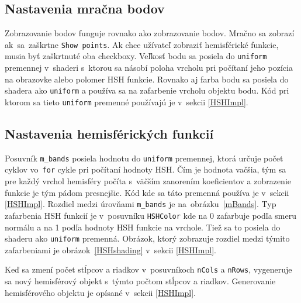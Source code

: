 \subsection*{Nastavenia mračna bodov}
Zobrazovanie bodov funguje rovnako ako zobrazovanie bodov. Mračno sa zobrazí ak~sa~zaškrtne \verb|Show points|. Ak chce užívateľ zobraziť hemisférické funkcie, musia byť zaškrtnuté oba checkboxy. Veľkosť bodu sa posiela do \verb|uniform| premennej v~shaderi s~ktorou sa násobí poloha vrcholu pri počítaní jeho pozícia na obrazovke alebo polomer HSH funkcie. Rovnako aj farba bodu sa posiela do shadera ako \verb|uniform| a používa sa na zafarbenie vrcholu objektu bodu. Kód pri ktorom sa tieto \verb|uniform| premenné používajú je v~sekcii \ref{HSHImpl}.

\subsection*{Nastavenia hemisférických funkcií}
Posuvník \verb|m_bands| posiela hodnotu do \verb|uniform| premennej, ktorá určuje počet cyklov vo~\verb|for| cykle pri počítaní hodnoty HSH. Čím je hodnota vačšia, tým sa pre každý vrchol hemisféry počíta s~väčším zanorením koeficientov a zobrazenie funkcie je tým pádom presnejšie. Kód kde sa táto premenná používa je v~sekcii \ref{HSHImpl}. Rozdiel medzi úrovňami \verb|m_bands| je na~obrázku~\ref{mBands}. Typ zafarbenia HSH funkcií je v~posuvníku \verb|HSHColor| kde na 0 zafarbuje podľa smeru normálu a na 1 podľa hodnoty HSH funkcie na vrchole. Tiež sa to posiela do shaderu ako \verb|uniform| premenná. Obrázok, ktorý zobrazuje rozdiel medzi týmito zafarbeniami je obrázok~\ref{HSHshading} v~sekcii \ref{HSHImpl}.

Keď sa zmení počet stĺpcov a riadkov v~posuvníkoch \verb|nCols| a \verb|nRows|, vygeneruje sa nový hemisférový objekt s~týmto počtom stĺpcov a riadkov. Generovanie hemisférového objektu je opísané v~sekcii \ref{HSHImpl}. 

